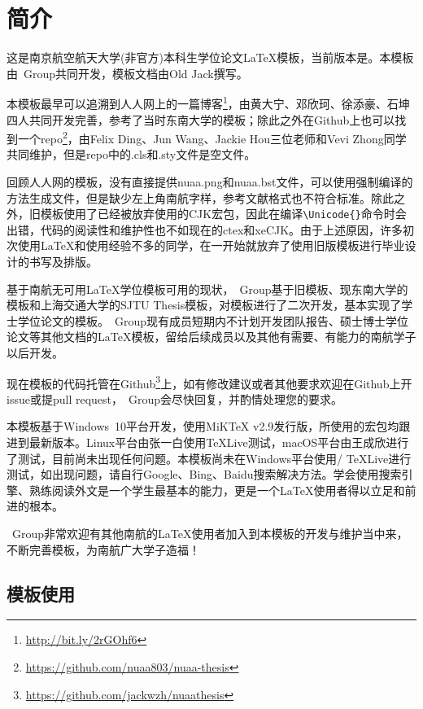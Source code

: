 \chapter{简介}\label{chap:intro}

这是南京航空航天大学(非官方)本科生学位论文\LaTeX 模板，当前版本是\version。本模板由\nuaathesis~Group共同开发，模板文档由Old Jack撰写。

本模板最早可以追溯到人人网上的一篇博客\footnote{\url{http://bit.ly/2rGOhf6}}，由黄大宁、邓欣珂、徐添豪、石坤四人共同开发完善，参考了当时东南大学的\seuthesix 模板；除此之外在Github上也可以找到一个repo\footnote{\url{https://github.com/nuaa803/nuaa-thesis}}，由Felix Ding、Jun Wang、Jackie Hou三位老师和Vevi Zhong同学共同维护，但是repo中的.cls和.sty文件是空文件。

回顾人人网的模板，没有直接提供nuaa.png和nuaa.bst文件，可以使用强制编译的方法生成文件，但是缺少左上角南航字样，参考文献格式也不符合标准。除此之外，旧模板使用了已经被放弃使用的CJK宏包，因此在编译\verb+\Unicode{}+命令时会出错，代码的阅读性和维护性也不如现在的ctex和xeCJK。由于上述原因，许多初次使用\LaTeX 和使用经验不多的同学，在一开始就放弃了使用旧版模板进行毕业设计的书写及排版。

基于南航无可用\LaTeX 学位模板可用的现状，\nuaathesis~Group基于旧\oldnuaathesis 模板、现东南大学的\seuthesix 模板和上海交通大学的SJTU Thesis模板，对模板进行了二次开发，基本实现了学士学位论文的模板。\nuaathesis~Group现有成员短期内不计划开发团队报告、硕士博士学位论文等其他文档的\LaTeX 模板，留给后续成员以及其他有需要、有能力的南航学子以后开发。

现在\nuaathesis 模板的代码托管在Github\footnote{\url{https://github.com/jackwzh/nuaathesis}}上，如有修改建议或者其他要求欢迎在Github上开issue或提pull request，\nuaathesis~Group会尽快回复，并酌情处理您的要求。

本模板基于Windows~10平台开发，使用MiKTeX v2.9发行版，所使用的宏包均跟进到最新版本。Linux平台由张一白使用\TeX Live测试，macOS平台由王成欣进行了测试，目前尚未出现任何问题。本模板尚未在Windows平台使用\CTeX / \TeX Live进行测试，如出现问题，请自行Google、Bing、Baidu搜索解决方法。学会使用搜索引擎、熟练阅读外文是一个学生最基本的能力，更是一个\LaTeX 使用者得以立足和前进的根本。

\nuaathesis~Group非常欢迎有其他南航的\LaTeX 使用者加入到本模板的开发与维护当中来，不断完善模板，为南航广大学子造福！

\section{模板使用}
